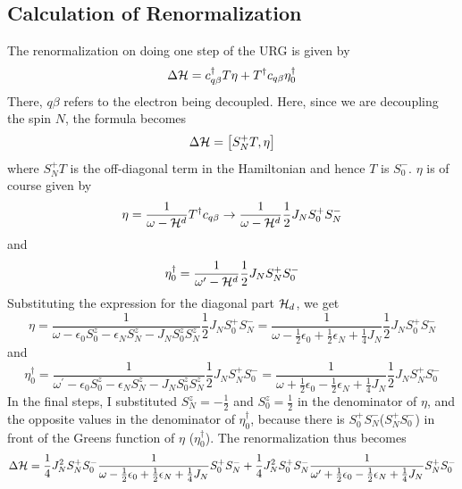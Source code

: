 \documentclass[12pt,twoside]{article}
\numberwithin{equation}{section}
\begin{document}
\subsection{Calculation of Renormalization}
The renormalization on doing one step of the URG is given by
\begin{equation}
	\Delta \mathcal{H} = c_{q\beta}^\dagger T \eta + T^\dagger c_{q\beta} \eta_0^\dagger
\end{equation}
There, \(q\beta\) refers to the electron being decoupled. Here, since we are decoupling the spin \(N\), the formula becomes
\begin{equation}
	\Delta \mathcal{H} = \left[S_N^+T,\eta\right]
\end{equation}
where \(S_N^+T\) is the  off-diagonal term in the Hamiltonian and hence \(T\) is  \(S_0^-\). \(\eta\) is of course given by
\begin{equation}
	\eta = \frac{1}{\omega - \mathcal{H}^d}T^\dagger c_{q\beta} \to \frac{1}{\omega - \mathcal{H}^d}\frac{1}{2}J_N S_0^+ S_N^-
\end{equation}
and
\begin{equation}
	\eta_0^\dagger = \frac{1}{\omega^\prime - \mathcal{H}^d}\frac{1}{2}J_N S_N^+ S_0^-
\end{equation}
Substituting the expression for the diagonal part \(\mathcal{H}_d\), we get
\begin{equation}
	\label{stareta}
	\eta  = \frac{1}{\omega - \epsilon_0 S^z_0 - \epsilon_N S^z_N - J_NS^z_0 S^z_N}\frac{1}{2}J_NS_0^+ S_N^- = \frac{1}{\omega - \frac{1}{2}\epsilon_0 + \frac{1}{2}\epsilon_N + \frac{1}{4}J_N}\frac{1}{2}J_NS_0^+ S_N^-
\end{equation}
and
\begin{equation}
	\eta_0^\dagger = \frac{1}{\omega^\prime - \epsilon_0 S^z_0 - \epsilon_N S^z_N - J_NS^z_0 S^z_N}\frac{1}{2}J_NS_N^+ S_0^- = \frac{1}{\omega + \frac{1}{2}\epsilon_0 - \frac{1}{2}\epsilon_N + \frac{1}{4}J_N}\frac{1}{2}J_NS_N^+ S_0^-
\end{equation}
In the final steps, I substituted \(S_N^z = -\frac{1}{2}\) and \(S_0^z = \frac{1}{2}\) in the denominator of \(\eta\), and the opposite values in the denominator of \(\eta_0^\dagger\), because there is \(S_0^+ S_N^-\)(\(S_N^+ S_0^-\)) in front of the Greens function of \(\eta\) (\(\eta_0^\dagger\)). The renormalization thus becomes
\begin{equation}
	\Delta \mathcal{H} = \frac{1}{4}J_N^2 S_N^+S_0^- \frac{1}{\omega - \frac{1}{2}\epsilon_0 + \frac{1}{2}\epsilon_N + \frac{1}{4}J_N}S_0^+ S_N^- + \frac{1}{4}J_N^2S_0^+ S_N^- \frac{1}{\omega^\prime + \frac{1}{2}\epsilon_0 - \frac{1}{2}\epsilon_N + \frac{1}{4}J_N} S_N^+S_0^-
\end{equation}
\end{document}
